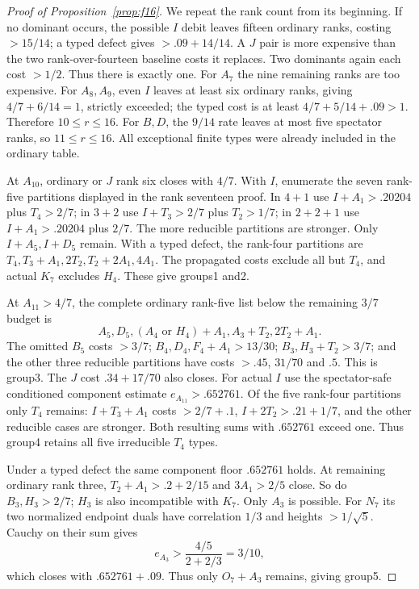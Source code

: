 \documentclass[11pt]{article}
\begin{document}
\begin{proof}[Proof of Proposition~\ref{prop:f16}]
We repeat the rank count from its beginning. If no dominant occurs,
the possible $I$ debit leaves fifteen ordinary ranks, costing $>15/14$;
a typed defect gives $>.09+14/14$. A $J$ pair is more expensive than
the two rank-over-fourteen baseline costs it replaces. Two dominants
again each cost $>1/2$. Thus there is exactly one.
For $A_7$ the nine remaining ranks are too expensive. For $A_8,A_9$,
even $I$ leaves at least six ordinary ranks, giving
$4/7+6/14=1$, strictly exceeded; the typed cost is at least
$4/7+5/14+.09>1$. Therefore $10\le r\le16$.
For $B,D$, the $9/14$ rate leaves at most five spectator ranks,
so $11\le r\le16$. All exceptional finite types were already
included in the ordinary table.

At $A_{10}$, ordinary or $J$ rank six closes with $4/7$.
With $I$, enumerate the seven rank-five partitions displayed in the
rank seventeen proof. In $4+1$ use $I+A_1>.20204$ plus $T_4>2/7$;
in $3+2$ use $I+T_3>2/7$ plus $T_2>1/7$; in $2+2+1$
use $I+A_1>.20204$ plus $2/7$. The more reducible partitions
are stronger. Only $I+A_5,I+D_5$ remain.
With a typed defect, the rank-four partitions are
$T_4,T_3+A_1,2T_2,T_2+2A_1,4A_1$.
The propagated costs exclude all but $T_4$, and actual $K_7$
excludes $H_4$. These give groups1 and2.

At $A_{11}>4/7$, the complete ordinary rank-five list below the
remaining $3/7$ budget is
\[
 A_5,D_5,(A_4\text{ or }H_4)+A_1,A_3+T_2,2T_2+A_1.
\]
The omitted $B_5$ costs $>3/7$;
$B_4,D_4,F_4+A_1>13/30$;
$B_3,H_3+T_2>3/7$; and the other three reducible partitions
have costs $>.45$, $31/70$ and $.5$. This is group3.
The $J$ cost $.34+17/70$ also closes.
For actual $I$ use the spectator-safe conditioned component estimate
$e_{A_{11}}>.652761$. Of the five rank-four partitions only $T_4$
remains: $I+T_3+A_1$ costs $>2/7+.1$,
$I+2T_2>.21+1/7$, and the other reducible cases are stronger.
Both resulting sums with $.652761$ exceed one. Thus group4 retains
all five irreducible $T_4$ types.

Under a typed defect the same component floor $.652761$ holds.
At remaining ordinary rank three, $T_2+A_1>.2+2/15$ and
$3A_1>2/5$ close. So do $B_3,H_3>2/7$; $H_3$ is also
incompatible with $K_7$. Only $A_3$ is possible. For $N_7$ its
two normalized endpoint duals have correlation $1/3$ and heights
$>1/\sqrt5$. Cauchy on their sum gives
\[
 e_{A_3}>\frac{4/5}{2+2/3}=3/10,
\]
which closes with $.652761+.09$. Thus only $O_7+A_3$ remains,
giving group5.


\end{proof}
\end{document}
